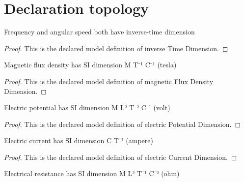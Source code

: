 \section{Declaration topology}
\begin{definition}
  \label{def:physics:phyx-mini-0982:phyxminiproblems-problemphyxmini0982-inversetimedimension}
  Frequency and angular speed both have inverse-time dimension
\end{definition}
\begin{proof}
  This is the declared model definition of inverse Time Dimension.
\end{proof}
\begin{definition}
  \label{def:physics:phyx-mini-0982:phyxminiproblems-problemphyxmini0982-magneticfluxdensitydimension}
  Magnetic flux density has SI dimension M T⁻¹ C⁻¹ (tesla)
\end{definition}
\begin{proof}
  This is the declared model definition of magnetic Flux Density Dimension.
\end{proof}
\begin{definition}
  \label{def:physics:phyx-mini-0982:phyxminiproblems-problemphyxmini0982-electricpotentialdimension}
  Electric potential has SI dimension M L² T⁻² C⁻¹ (volt)
\end{definition}
\begin{proof}
  This is the declared model definition of electric Potential Dimension.
\end{proof}
\begin{definition}
  \label{def:physics:phyx-mini-0982:phyxminiproblems-problemphyxmini0982-electriccurrentdimension}
  Electric current has SI dimension C T⁻¹ (ampere)
\end{definition}
\begin{proof}
  This is the declared model definition of electric Current Dimension.
\end{proof}
\begin{definition}
  \label{def:physics:phyx-mini-0982:phyxminiproblems-problemphyxmini0982-electricalresistancedimension}
  Electrical resistance has SI dimension M L² T⁻¹ C⁻² (ohm)
\end{definition}
